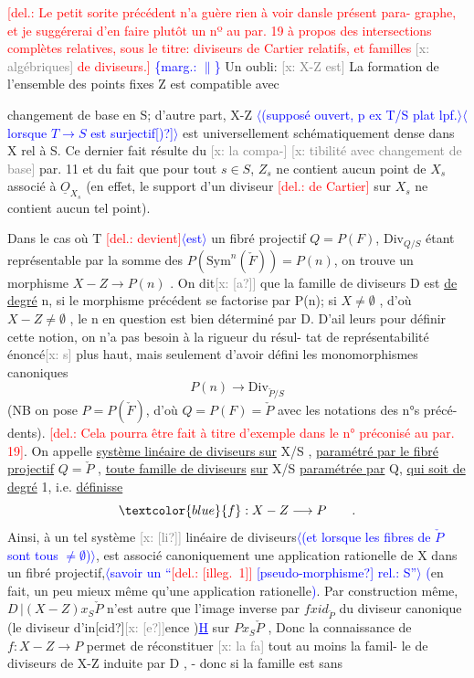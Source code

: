 \documentclass[11pt]{article}
\newcommand{\scanpage}[1]{\par\bigskip\noindent{\small\sffamily[scan #1]}\par}
\newcommand{\mspage}[1]{{\small\sffamily[p.\,#1]}}
\newcommand{\hand}[1]{\textcolor{blue}{#1}}
\newcommand{\inserted}[2][]{\textcolor{blue}{$\langle$#2$\rangle$}}
\newcommand{\margin}[1]{\textcolor{blue}{\{\textsf{marg.:} #1\}}}
\newcommand{\deleted}[1]{\textcolor{red}{[\textsf{del.:} #1]}}
\newcommand{\xout}[1]{\textcolor{gray}{[\textsf{x:} #1]}}
\newcommand{\uline}[1]{\underline{#1}}
\newcommand{\unsure}[1]{[#1?]}
\newcommand{\illegible}[1]{[\textsf{illeg.\ #1}]}
\begin{document}
\deleted{Le petit sorite précédent n'a guère rien à voir dansle présent para-%
graphe, et je suggérerai d'en faire plutôt un nº au par. 19 à propos des
intersections complètes relatives, sous le titre: diviseurs de Cartier
relatifs, et familles \xout{algébriques} de diviseurs.} \margin{$\|$} Un oubli: \xout{X-Z est}
La formation de l'ensemble des points fixes Z est compatible avec

\mspage{114}

\clearpage
\scanpage{25/115}
\mspage{18}
changement de base en S; d'autre part, X-Z \inserted[typed]{(supposé ouvert, p ex T/S plat lpf.}\inserted{lorsque $T \to S$ est surjectif\unsure{)}} est universellement
schématiquement dense dans X rel à S. Ce dernier fait résulte du \xout{la compa-}
\xout{tibilité avec changement de base} par. 11 et du fait que pour tout $s \in S$,
$Z_s$ ne contient aucun point de $X_s$ associé à $\underline{O}_{X_s}$ (en effet, le support d'un
diviseur \deleted{de Cartier} sur $X_s$ ne contient aucun tel point).

Dans le cas où T \deleted{devient}\inserted{est} un fibré projectif $Q=P(F)$, $\mathrm{Div}_{Q/S}$
étant représentable par la somme des $P(\mathrm{Sym}^n(\check{F})) = P(n)$, on trouve
un morphisme $X-Z \longrightarrow P(n)$ . On dit\xout{\unsure{a}} que la famille de diviseurs
D est \uline{de degré} n, si le morphisme précédent se factorise par P(n); si
$X \neq \emptyset$ , d'où $X-Z \neq \emptyset$ , le n en question est bien déterminé par D. D'ail%
leurs pour définir cette notion, on n'a pas besoin à la rigueur du résul-%
tat de représentabilité énoncé\xout{s} plus haut, mais seulement d'avoir défini
les monomorphismes canoniques
\[ P(n) \longrightarrow \mathrm{Div}_{\check{P}/S} \]
(NB on pose $P = P(\check{F})$, d'où $Q = P(F) = \check{P}$ avec les notations des n°s précé-%
dents). \deleted{Cela pourra être fait à titre d'exemple dans le n° préconisé au
par. 19}. On appelle \uline{système linéaire de diviseurs sur} X/S , \uline{paramétré
par le fibré projectif} $Q = \check{P}$ , \uline{toute famille de diviseurs} \uline{sur} X/S
\uline{paramétrée par} Q, \uline{qui soit de degré} 1, i.e. \uline{définisse}
\[ \hand{f} : X-Z \longrightarrow P \qquad . \]
Ainsi, à un tel système \xout{\unsure{li}} linéaire de diviseurs\inserted{(et lorsque les fibres de $\check{P}$ sont tous $\neq \emptyset$)}, est associé canoniquement
une application rationelle de X dans un fibré projectif,\inserted{savoir un ``\deleted{\illegible{1}} \unsure{pseudo-morphisme} rel.: S''} \hand{(}en fait, un peu
mieux même qu'une application rationelle\hand{)}. Par construction même,
$D\,|(X-Z)x_S\check{P}$ n'est autre que l'image inverse par $f x id_{\check{P}}$ du diviseur
canonique (le diviseur d'in\unsure{cid}\xout{\unsure{e}}ence )\hand{\uline{H}} sur $Px_S\check{P}$ , Donc la connaissance
de $f: X-Z \longrightarrow P$ permet de réconstituer \xout{la fa} tout au moins la famil-%
le de diviseurs de X-Z induite par D , - donc si la famille est sans
\mspage{115}
\end{document}
